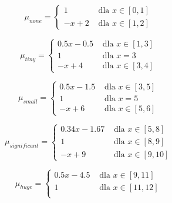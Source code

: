 \documentclass{classrep}
\begin{document}
\begin{enumerate}
  \begin{equation}
    \mu_{none} =
      \begin{cases}
        1 & \text{ dla } x \in [0,1] \\
        -x+2  & \text{ dla } x \in [1,2]
      \end{cases}  
  \end{equation}

  \begin{equation}
    \mu_{tiny} =
      \begin{cases}
        0.5x-0.5 & \text{ dla } x \in [1,3] \\
        1 & \text{ dla } x =3 \\
        -x+4  & \text{ dla } x \in [3,4]
      \end{cases}  
  \end{equation}

  \begin{equation}
    \mu_{small} =
      \begin{cases}
        0.5x-1.5 & \text{ dla } x \in [3,5] \\
        1 & \text{ dla } x =5 \\
        -x+6  & \text{ dla } x \in [5,6]
      \end{cases}  
  \end{equation}

  \begin{equation}
    \mu_{significant} =
      \begin{cases}
        0.34x-1.67 & \text{ dla } x \in [5,8] \\
        1 & \text{ dla } x \in [8,9] \\
        -x+9  & \text{ dla } x \in [9,10]
      \end{cases}  
  \end{equation}

  \begin{equation}
    \mu_{huge} =
      \begin{cases}
        0.5x-4.5 & \text{ dla } x \in [9,11] \\
        1 & \text{ dla } x \in [11,12] \\
      \end{cases}  
  \end{equation}


\end{enumerate}
\end{document}
